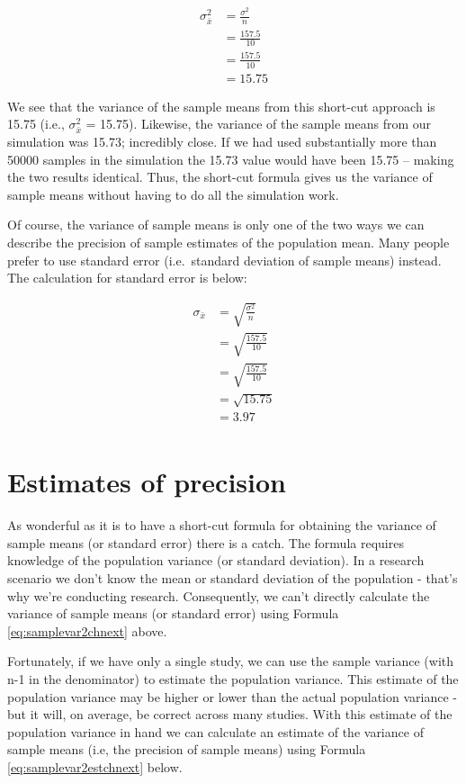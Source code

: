 \documentclass[
]{krantz}
\begin{document}
\[
\begin{aligned} 
\sigma_{\bar{x}}^2 &= \frac{\sigma^2}{n} \\
&= \frac{157.5}{10}\\
&= \frac{157.5}{10}\\
&= 15.75
\end{aligned} 
\]

We see that the variance of the sample means from this short-cut approach is 15.75 (i.e., \(\sigma_{\bar{x}}^2\) = 15.75). Likewise, the variance of the sample means from our simulation was 15.73; incredibly close. If we had used substantially more than 50000 samples in the simulation the 15.73 value would have been 15.75 -- making the two results identical. Thus, the short-cut formula gives us the variance of sample means without having to do all the simulation work.

Of course, the variance of sample means is only one of the two ways we can describe the precision of sample estimates of the population mean. Many people prefer to use standard error (i.e.~standard deviation of sample means) instead. The calculation for standard error is below:

\[
\begin{aligned} 
\sigma_{\bar{x}} &= \sqrt{\frac{\sigma^2}{n}} \\
&= \sqrt{\frac{157.5}{10}}\\
&= \sqrt{\frac{157.5}{10}}\\
&= \sqrt{15.75} \\
&= 3.97 \\
\end{aligned} 
\]

\hypertarget{estimates-of-precision}{%
\section{Estimates of precision}\label{estimates-of-precision}}

As wonderful as it is to have a short-cut formula for obtaining the variance of sample means (or standard error) there is a catch. The formula requires knowledge of the population variance (or standard deviation). In a research scenario we don't know the mean or standard deviation of the population - that's why we're conducting research. Consequently, we can't directly calculate the variance of sample means (or standard error) using Formula \eqref{eq:samplevar2chnext} above.

Fortunately, if we have only a single study, we can use the sample variance (with n-1 in the denominator) to estimate the population variance. This estimate of the population variance may be higher or lower than the actual population variance - but it will, on average, be correct across many studies. With this estimate of the population variance in hand we can calculate an estimate of the variance of sample means (i.e, the precision of sample means) using Formula \eqref{eq:samplevar2estchnext} below.
\end{document}

